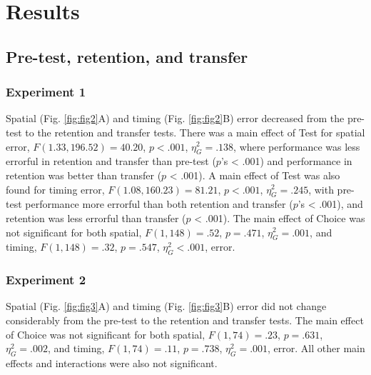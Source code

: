 \documentclass[
  doc, donotrepeattitle,floatsintext]{apa7}
\begin{document}
\hypertarget{results}{%
\section{Results}\label{results}}

\hypertarget{pre-test-retention-and-transfer}{%
\subsection{Pre-test, retention, and transfer}\label{pre-test-retention-and-transfer}}

\hypertarget{experiment-1-2}{%
\subsubsection{Experiment 1}\label{experiment-1-2}}

Spatial (Fig. \ref{fig:fig2}A) and timing (Fig. \ref{fig:fig2}B) error decreased from the pre-test to the retention and transfer tests. There was a main effect of Test for spatial error, \(F(1.33,196.52) = 40.20\), \(p < .001\), \(\eta_{G}^2 = .138\), where performance was less errorful in retention and transfer than pre-test (\(p\)'s \textless{} .001) and performance in retention was better than transfer (\(p\) \textless{} .001). A main effect of Test was also found for timing error, \(F(1.08,160.23) = 81.21\), \(p < .001\), \(\eta_{G}^2 = .245\), with pre-test performance more errorful than both retention and transfer (\(p\)'s \textless{} .001), and retention was less errorful than transfer (\(p\) \textless{} .001). The main effect of Choice was not significant for both spatial, \(F(1,148) = .52\), \(p = .471\), \(\eta_{G}^2 = .001\), and timing, \(F(1,148) = .32\), \(p = .547\), \(\eta_{G}^2 < .001\), error.

\hypertarget{experiment-2-2}{%
\subsubsection{Experiment 2}\label{experiment-2-2}}

Spatial (Fig. \ref{fig:fig3}A) and timing (Fig. \ref{fig:fig3}B) error did not change considerably from the pre-test to the retention and transfer tests. The main effect of Choice was not significant for both spatial, \(F(1,74) = .23\), \(p = .631\), \(\eta_{G}^2 = .002\), and timing, \(F(1,74) = .11\), \(p = .738\), \(\eta_{G}^2 = .001\), error. All other main effects and interactions were also not significant.

\clearpage
\end{document}
